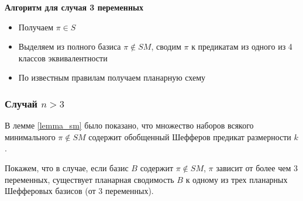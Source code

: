 \documentclass[12pt]{article}
\begin{document}
\textbf{Алгоритм для случая 3 переменных}
\begin{itemize}
\item{Получаем $\pi \in S$}
\item{Выделяем из полного базиса $\pi \notin SM$, сводим $\pi$ к предикатам из одного из 4 классов эквивалентности}
\item{По известным правилам получаем планарную схему}
\end{itemize}

\subsubsection{Случай $n > 3$}
В лемме \ref{lemma_sm} было показано, что множество наборов всякого минимального $\pi \notin SM$ содержит обобщенный
Шефферов предикат размерности $k$.

Покажем, что в случае, если базис $B$ содержит $\pi \notin SM$, $\pi$ зависит от более чем 3 переменных, существует планарная
сводимость $B$ к одному из трех планарных Шефферовых базисов (от 3 переменных).
\end{document}
